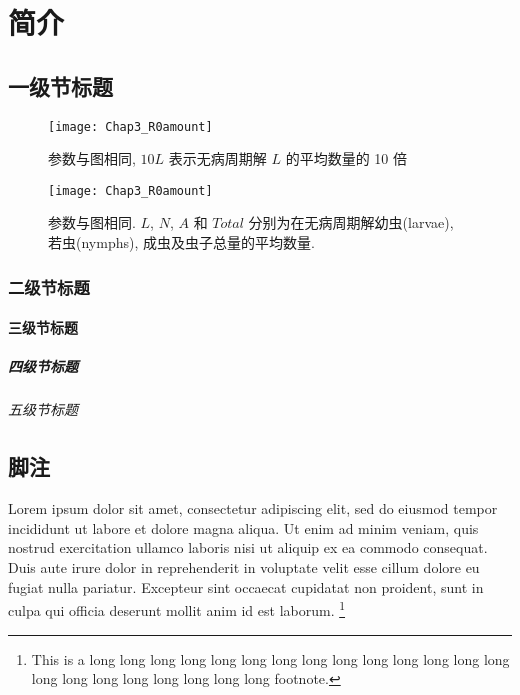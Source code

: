 \chapter{简介}

\section{一级节标题}

\begin{figure}[htbp]
  \begin{minipage}[t]{0.45\linewidth}
    \centering
    \texttt{[image: Chap3\_R0amount]}
    \caption{参数与图相同, $10L$ 表示无病周期解 $L$ 的平均数量的 10 倍}
  \end{minipage}
  \hspace{1cm}
  \begin{minipage}[t]{0.45\linewidth}
    \centering
    \texttt{[image: Chap3\_R0amount]}
    \caption{参数与图相同. $L$, $N$, $A$ 和 $Total$ 分别为在无病周期解幼虫(larvae), 若虫(nymphs), 成虫及虫子总量的平均数量.}
  \end{minipage}
\end{figure}

\subsection{二级节标题}

\subsubsection{三级节标题}

\paragraph{四级节标题}

\subparagraph{五级节标题}

\section{脚注}

Lorem ipsum dolor sit amet, consectetur adipiscing elit, sed do eiusmod tempor
incididunt ut labore et dolore magna aliqua. Ut enim ad minim veniam, quis
nostrud exercitation ullamco laboris nisi ut aliquip ex ea commodo consequat.
Duis aute irure dolor in reprehenderit in voluptate velit esse cillum dolore eu
fugiat nulla pariatur. Excepteur sint occaecat cupidatat non proident, sunt in
culpa qui officia deserunt mollit anim id est laborum.
\footnote{This is a long long long long long long long long long long long long
long long long long long long long long long long footnote.}
